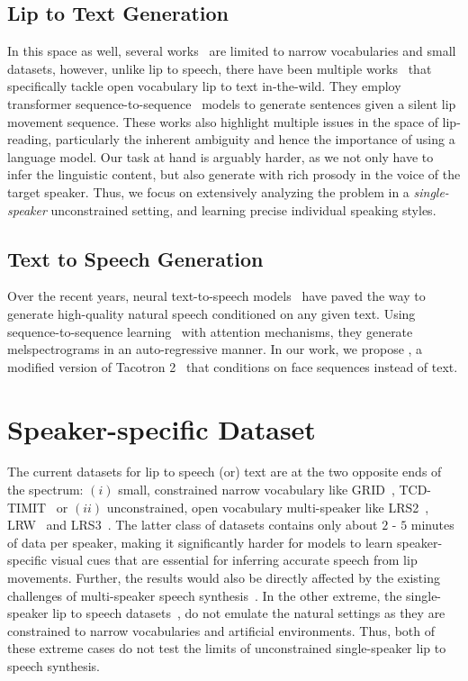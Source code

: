 \documentclass[10pt,twocolumn,letterpaper]{article}
\begin{document}
\subsection{Lip to Text Generation}
In this space as well, several works~\cite{chung2016lip,xu2018lcanet,wand2016lipreading,qu2019lipsound} are limited to narrow vocabularies and small datasets, however, unlike lip to speech, there have been multiple works~\cite{chung2017lip,Afouras2018DeepLR} that specifically tackle open vocabulary lip to text in-the-wild. They employ transformer sequence-to-sequence~\cite{vaswani2017attention} models to generate sentences given a silent lip movement sequence. These works also highlight multiple issues in the space of lip-reading, particularly the inherent ambiguity and hence the importance of using a language model. Our task at hand is arguably harder, as we not only have to infer the linguistic content, but also generate with rich prosody in the voice of the target speaker. Thus, we focus on extensively analyzing the problem in a \textit{single-speaker} unconstrained setting, and learning precise individual speaking styles. 

\subsection{Text to Speech Generation}
Over the recent years, neural text-to-speech models~\cite{shen2018natural,ping2017deep} have paved the way to generate high-quality natural speech conditioned on any given text. Using sequence-to-sequence learning~\cite{sutskever2014sequence} with attention mechanisms, they generate melspectrograms in an auto-regressive manner. In our work, we propose \modelnamewithoutspace, a modified version of Tacotron 2~\cite{shen2018natural} that conditions on face sequences instead of text.

\section{Speaker-specific \modelname Dataset}
\label{section:dataset}

The current datasets for lip to speech (or) text are at the two opposite ends of the spectrum: $(i)$ small, constrained narrow vocabulary like GRID~\cite{cooke2006audio}, TCD-TIMIT~\cite{harte2015tcd} or $(ii)$ unconstrained, open vocabulary multi-speaker like LRS2~\cite{Afouras2018DeepLR}, LRW~\cite{chung2016lip} and LRS3~\cite{afouras2018lrs3}. The latter class of datasets contains only about $2$ - $5$ minutes of data per speaker, making it significantly harder for models to learn speaker-specific visual cues that are essential for inferring accurate speech from lip movements. Further, the results would also be directly affected by the existing challenges of multi-speaker speech synthesis~\cite{gibiansky2017deep,jia2018transfer}. In the other extreme, the single-speaker lip to speech datasets~\cite{cooke2006audio,harte2015tcd}, do not emulate the natural settings as they are constrained to narrow vocabularies and artificial environments. Thus, both of these extreme cases do not test the limits of unconstrained single-speaker lip to speech synthesis. 
\end{document}
